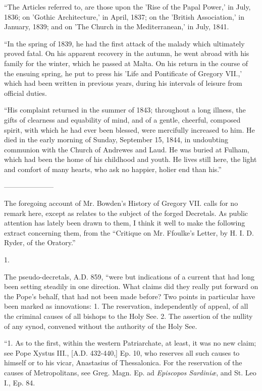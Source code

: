 ``The Articles referred to, are those upon the
'Rise of the Papal Power,' in July, 1836; on 'Gothic Architecture,' in
April, 1837; on the 'British Association,' in January, 1839; and on
'The Church in the Mediterranean,' in July, 1841.

``In the spring of 1839, he had the first attack
of the malady which ultimately proved fatal. On his apparent recovery
in the autumn, he went abroad with his family for the winter, which he
passed at Malta. On his return in the course of the ensuing spring, he
put to press his 'Life and Pontificate of Gregory VII.,' which had
been written in previous years, during his intervals of leisure from
official duties.

``His complaint returned in the summer of 1843;
throughout a long illness, the gifts of clearness and equability of
mind, and of a gentle, cheerful, composed spirit, with which he had
ever been blessed, were mercifully increased to him. He died in the
early morning of Sunday, September 15, 1844, in undoubting communion
with the Church of Andrewes and Laud. He was buried at Fulham, which
had been the home of his childhood and youth. He lives still here, the
light and comfort of many hearts, who ask no happier, holier end than
his.''

———————

The foregoing account of Mr. Bowden's History of
Gregory VII. calls for no remark here, except as relates to the
subject of the forged Decretals. As public attention has lately been
drawn to them, I think it well to make the following extract
concerning them, from the ``Critique on Mr. Ffoulke's Letter, by H. I.
D. Ryder, of the Oratory.''

1.

The pseudo-decretals, A.D.
859, ``were but indications of a current that had long been setting
steadily in one direction. What claims did they really put forward on
the Pope's behalf, that had not been made before? Two points in
particular have been marked as innovations: 1. The reservation,
independently of appeal, of all the criminal causes of all bishops to
the Holy See. 2. The assertion of the nullity of any synod, convened
without the authority of the Holy See.

``1. As to the first, within the western
Patriarchate, at least, it was no new claim; see Pope Xystus III., [A.D.
432-440,] Ep. 10, who reserves all such causes to himself or to his
vicar, Anastasius of Thessalonica. For the reservation of the causes
of Metropolitans, see Greg. Magn. Ep. ad \emph{Episcopos Sardiniæ},
and St. Leo I., Ep. 84.

